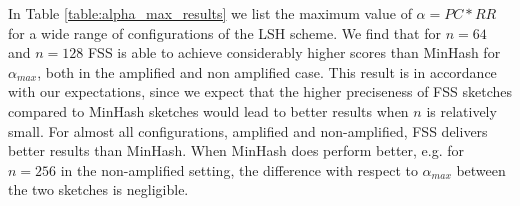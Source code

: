 In Table \ref{table:alpha_max_results} we list the maximum value of $\alpha = PC * RR$ for a wide range of configurations of the LSH scheme. We find that for $n=64$ and $n=128$ FSS is able to achieve considerably higher scores than MinHash for $\alpha_{max}$, both in the amplified and non amplified case. This result is in accordance with our expectations, since we expect that the higher preciseness of FSS sketches compared to MinHash sketches would lead to better results when $n$ is relatively small. For almost all configurations, amplified and non-amplified, FSS delivers better results than MinHash. When MinHash does perform better, e.g. for $n=256$ in the non-amplified setting, the difference with respect to $\alpha_{max}$ between the two sketches is negligible. 

